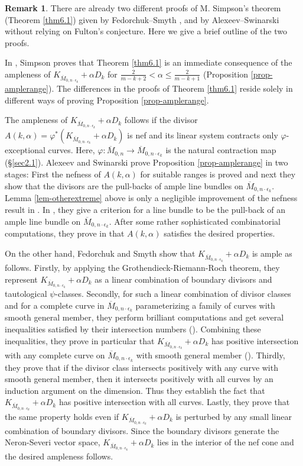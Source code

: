 \documentclass[10pt]{amsart}
\theoremstyle{definition}
\newtheorem{remark}[theorem]{Remark}
\def\Mzn{\overline{M}_{0,n} }
\def\Mzek{\overline{M}_{0,n\cdot \epsilon_k} }
\begin{document}
\begin{remark}\label{rem-compproofs}
There are already two different proofs of M. Simpson's theorem
(Theorem \ref{thm6.1}) given by Fedorchuk--Smyth \cite{FedoSmyt},
and by Alexeev--Swinarski \cite{AlexSwin} without relying on
Fulton's conjecture. Here we give a brief outline of the two
proofs.

In \cite[Corollary 3.5]{Simpson}, Simpson proves that Theorem
\ref{thm6.1} is an immediate consequence of the ampleness of
$K_{\Mzek} + \alpha D_k$ for $\frac{2}{m-k+2} < \alpha \le
\frac{2}{m-k+1}$ (Proposition \ref{prop-amplerange}). The differences in
the proofs of Theorem \ref{thm6.1} reside solely in different ways
of proving Proposition \ref{prop-amplerange}.

The ampleness of $K_{\Mzek} + \alpha D_k$ follows if the divisor
$A(k, \alpha) = \varphi^*(K_{\Mzek}+\alpha D_k)$ is nef and its
linear system contracts only $\varphi$-exceptional curves. Here,
$\varphi : \Mzn \to \Mzek$ is the natural contraction map
(\S\ref{sec2.1}). Alexeev and Swinarski prove Proposition
\ref{prop-amplerange} in two stages: First the nefness of $A(k,
\alpha)$ for suitable ranges is proved and next they show that the
divisors are the pull-backs of ample line bundles on $\Mzek$.
Lemma \ref{lem-otherextreme} above is only a negligible
improvement of the nefness result in \cite[\S3]{AlexSwin}. In
\cite[Theorem 4.1]{AlexSwin}, they give a criterion for a line
bundle to be the pull-back of an ample line bundle on $\Mzek$.
After some rather sophisticated combinatorial computations, they
prove in \cite[Proposition 4.2]{AlexSwin} that $A(k, \alpha)$
satisfies the desired properties.

On the other hand, Fedorchuk and Smyth show that $K_{\Mzek} +
\alpha D_k$ is ample as follows. Firstly, by applying the
Grothendieck-Riemann-Roch theorem, they represent
$K_{\Mzek}+\alpha D_k$ as a linear combination of boundary
divisors and tautological $\psi$-classes. Secondly, for such a
linear combination of divisor classes and for a complete curve in
$\Mzek$ parameterizing a family of curves with smooth general
member, they perform brilliant computations and get several
inequalities satisfied by their intersection numbers
(\cite[Proposition 3.2]{FedoSmyt}). Combining these inequalities,
they prove in particular that $K_{\Mzek}+\alpha D_k$ has positive
intersection with any complete curve on $\Mzek$ with smooth
general member (\cite[Theorem 4.3]{FedoSmyt}). Thirdly, they prove
that if the divisor class intersects positively with any curve
with smooth general member, then it intersects positively with all
curves by an induction argument on the dimension. Thus they
establish the fact that $K_{\Mzek}+\alpha D_k$ has positive
intersection with all curves. Lastly, they prove that the same
property holds even if $K_{\Mzek}+\alpha D_k$ is perturbed by any
small linear combination of boundary divisors. Since the boundary
divisors generate the Neron-Severi vector space, $K_{\Mzek}+\alpha
D_k$ lies in the interior of the nef cone and the desired
ampleness follows.
\end{remark}
\end{document}
